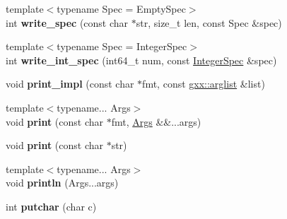 \begin{DoxyCompactItemize}
\item 
{\footnotesize template$<$typename Spec  = Empty\+Spec$>$ }\\int {\bfseries write\+\_\+spec} (const char $\ast$str, size\+\_\+t len, const Spec \&spec)\hypertarget{classgxx_1_1io_1_1format__writer_a0a6b5523382a408f3e8a281f42fd9c1f}{}\label{classgxx_1_1io_1_1format__writer_a0a6b5523382a408f3e8a281f42fd9c1f}

\item 
{\footnotesize template$<$typename Spec  = Integer\+Spec$>$ }\\int {\bfseries write\+\_\+int\+\_\+spec} (int64\+\_\+t num, const \hyperlink{classgxx_1_1io_1_1IntegerSpec}{Integer\+Spec} \&spec)\hypertarget{classgxx_1_1io_1_1format__writer_ad142c2af00de5de8420250bedc2ae445}{}\label{classgxx_1_1io_1_1format__writer_ad142c2af00de5de8420250bedc2ae445}

\item 
void {\bfseries print\+\_\+impl} (const char $\ast$fmt, const \hyperlink{classgxx_1_1arglist}{gxx\+::arglist} \&list)\hypertarget{classgxx_1_1io_1_1format__writer_a01a3431e84008b5adfda020e874b1fcb}{}\label{classgxx_1_1io_1_1format__writer_a01a3431e84008b5adfda020e874b1fcb}

\item 
{\footnotesize template$<$typename... Args$>$ }\\void {\bfseries print} (const char $\ast$fmt, \hyperlink{structArgs}{Args} \&\&...args)\hypertarget{classgxx_1_1io_1_1format__writer_a8e74d35d303875e1b1c5f2cb0d768a17}{}\label{classgxx_1_1io_1_1format__writer_a8e74d35d303875e1b1c5f2cb0d768a17}

\item 
void {\bfseries print} (const char $\ast$str)\hypertarget{classgxx_1_1io_1_1format__writer_a400643ef00c00601f672569d73882b71}{}\label{classgxx_1_1io_1_1format__writer_a400643ef00c00601f672569d73882b71}

\item 
{\footnotesize template$<$typename... Args$>$ }\\void {\bfseries println} (Args...\+args)\hypertarget{classgxx_1_1io_1_1format__writer_abc83ba815281c94ec2a5c9cd9550de3b}{}\label{classgxx_1_1io_1_1format__writer_abc83ba815281c94ec2a5c9cd9550de3b}

\item 
int {\bfseries putchar} (char c)\hypertarget{classgxx_1_1io_1_1format__writer_a4e4b84faa244ee84f84f9c0bf8107912}{}\label{classgxx_1_1io_1_1format__writer_a4e4b84faa244ee84f84f9c0bf8107912}


\end{DoxyCompactItemize}
